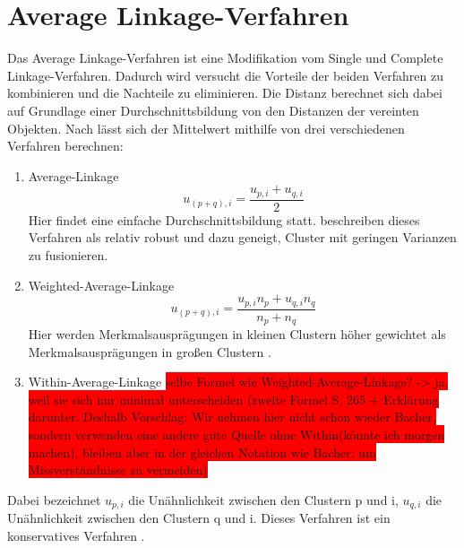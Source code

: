 \section{Average Linkage-Verfahren}
Das Average Linkage-Verfahren ist eine Modifikation vom Single und Complete Linkage-Verfahren. Dadurch wird versucht die Vorteile der beiden Verfahren zu kombinieren und die Nachteile zu eliminieren. Die Distanz berechnet sich dabei auf Grundlage einer Durchschnittsbildung von den Distanzen der vereinten Objekten.
Nach \citet[S. 264]{Bacher.2010} lässt sich der Mittelwert mithilfe von drei verschiedenen Verfahren berechnen:
\begin{enumerate}
	\item Average-Linkage
	\begin{equation}
		u_{(p+q),i} = \frac{u_{p,i} + u_{q,i}}{2}
	\end{equation}
	Hier findet eine einfache Durchschnittsbildung statt. \citet[S. 79]{Everitt.2011} beschreiben dieses Verfahren als relativ robust und dazu geneigt, Cluster mit geringen Varianzen zu fusionieren.
	\item Weighted-Average-Linkage
	\begin{equation}
		u_{(p+q),i} = \frac{u_{p,i}n_{p} + u_{q,i}n_{q}}{n_{p} + n_{q}}
	\end{equation}
	Hier werden Merkmalsausprägungen in kleinen Clustern höher gewichtet als Merkmalsausprägungen in großen Clustern \citep[Vgl.][S. 79]{Everitt.2011}.
	\item Within-Average-Linkage \colorbox{red}{selbe Formel wie Weighted-Average-Linkage? -> ja, weil sie sich nur minimal unterscheiden (zweite Formel S. 265 + Erklärung darunter. Deshalb Vorschlag: Wir nehmen hier nicht schon wieder Bacher, sondern verwenden eine andere gute Quelle ohne Within(könnte ich morgen machen), bleiben aber in der gleichen Notation wie Bacher, um Missverständnisse zu vermeiden)}
\end{enumerate}
Dabei bezeichnet $u_{p,i}$ die Unähnlichkeit zwischen den Clustern p und i, $u_{q,i}$ die Unähnlichkeit zwischen den Clustern q und i.
Dieses Verfahren ist ein konservatives Verfahren \citep[Vgl.][S. 264-266]{Bacher.2010}. 

